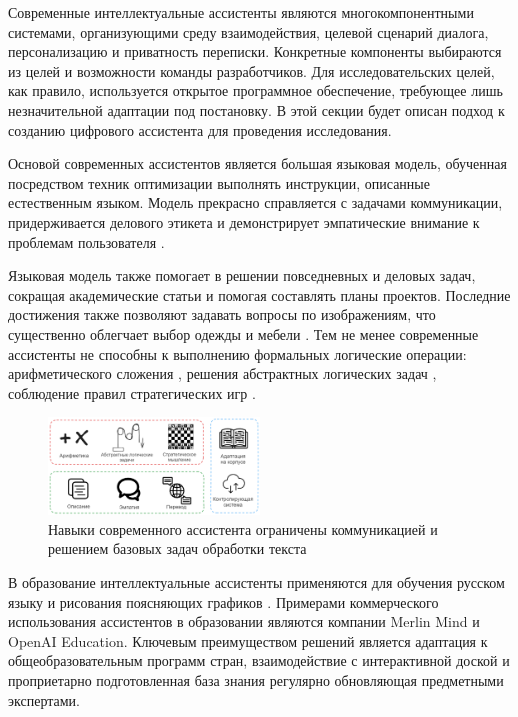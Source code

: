 Современные интеллектуальные ассистенты являются многокомпонентными системами, организующими
среду взаимодействия, целевой сценарий диалога, персонализацию и приватность переписки. Конкретные компоненты
выбираются из целей и возможности команды разработчиков. Для исследовательских целей, как правило, используется
открытое программное обеспечение, требующее лишь незначительной адаптации под постановку. В этой секции 
будет описан подход к созданию цифрового ассистента для проведения исследования. 

Основой современных ассистентов является большая языковая модель,
обученная посредством техник оптимизации выполнять инструкции, описанные естественным языком. 
Модель прекрасно справляется с задачами коммуникации, придерживается делового этикета и демонстрирует эмпатические
внимание к проблемам пользователя \cite{jiang2023mistral} \cite{llamatouvron2023}.

Языковая модель также помогает в решении повседневных и деловых задач, сокращая академические статьи и помогая составлять
планы проектов. Последние достижения также позволяют задавать вопросы по изображениям, что существенно облегчает
выбор одежды и мебели \cite{bai2023qwen}. Тем не менее современные ассистенты не способны 
к выполнению формальных логические операции: арифметического сложения \cite{bubeck2023sparks}, решения абстрактных логических задач \cite{bordt2023chatgpt}, соблюдение 
правил стратегических игр \cite{Adam2024}.

\begin{figure}[h]
    \centering
    \includegraphics[width=0.5\textwidth]{assets/work/arch/problems.excalidraw.png}
    \caption{Навыки современного ассистента ограничены коммуникацией и решением базовых задач обработки текста}
    \label{problems}
\end{figure}

В образование интеллектуальные ассистенты применяются для обучения русском языку \cite{аль2019интеллектуальный} 
и рисования поясняющих графиков \cite{bulusuautomated}. Примерами коммерческого
использования ассистентов в образовании являются компании Merlin Mind
и OpenAI Education. Ключевым преимуществом решений является адаптация к общеобразовательным программ стран, 
взаимодействие с интерактивной доской и проприетарно подготовленная база знания регулярно обновляющая предметными экспертами.
